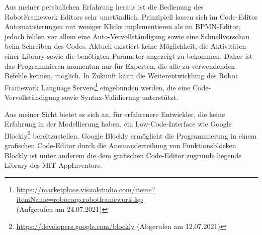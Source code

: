 Aus meiner persönlichen Erfahrung heraus ist die Bedienung des RobotFramework Editors sehr umständlich. Prinzipiell lassen sich im Code-Editor Automatisierungen mit weniger Klicks implementieren als im BPMN-Editor, jedoch fehlen vor allem eine Auto-Vervollständigung sowie eine Schnellvorschau beim Schreiben des Codes. Aktuell existiert keine Möglichkeit, die Aktivitäten einer Library sowie  die benötigten Parameter angezeigt zu bekommen. Daher ist das Programmieren momentan nur für Experten, die alle zu verwendenden Befehle kennen, möglich. In Zukunft kann die Weiterentwicklung des Robot Framework Language Servers\footnote{\url{https://marketplace.visualstudio.com/items?itemName=robocorp.robotframework-lsp} \\ (Aufgerufen am 24.07.2021)} eingebunden werden, die eine Code-Vervollständigung sowie Syntax-Validierung unterstützt.

Aus meiner Sicht bietet es sich an, für erfahrenere Entwickler, die keine Erfahrung in der Modellierung haben, ein Low-Code-Interface wie Google Blockly\footnote{\url{https://developers.google.com/blockly} (Abgerufen am 12.07.2021)} bereitzustellen. Google Blockly ermöglicht die Programmierung in einem grafischen Code-Editor durch die Aneinanderreihung von Funktionsblöcken. Blockly ist unter anderem die dem grafischen Code-Editor zugrunde liegende Library des  MIT AppInventors. 

